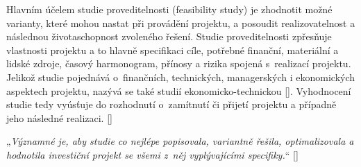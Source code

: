 \documentclass[
	11pt, oneside, printed, final, palatino, monochrome
	microtype,
	table,   %
	lof,     %
	lot     %
]{fithesis3}
\makeatletter
\newcommand{\citepages}[2]{[\cite[#1]{#2}]}
\newcommand{\citace}[1]{„\textit{#1}“} %
\newcommand{\mezera}{\bigskip}
\makeatother
\begin{document}
{Hlavním účelem studie proveditelnosti (feasibility study) je zhodnotit možné varianty, které mohou nastat při provádění projektu, a posoudit realizovatelnost a následnou životaschopnost zvoleného řešení. Studie proveditelnosti zpřesňuje vlastnosti projektu a to hlavně specifikaci cíle, potřebné finanční, materiální a lidské zdroje, časový harmonogram, přínosy a rizika spojená s~realizací projektu. Jelikož studie pojednává o~finančních, technických, managerských i ekonomických aspektech projektu, nazývá se také studií ekonomicko-technickou \citepages{19}{fotr_1995}. Vyhodnocení studie tedy vyúsťuje do rozhodnutí o~zamítnutí či přijetí projektu a případně jeho následné realizaci. \citepages{19-20}{fotr_1995} 

\mezera

\citace{Významné je, aby studie co nejlépe popisovala, variantně řešila, optimalizovala a hodnotila investiční projekt se všemi z~něj vyplývajícími specifiky.} \citepages{8}{Sieber2004} 

\mezera

}
\end{document}
